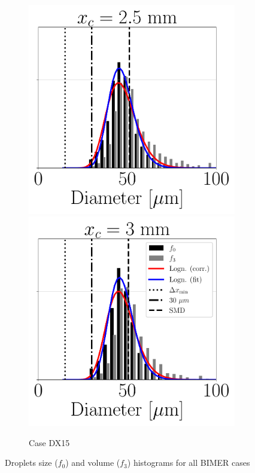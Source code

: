 \begin{figure}[ht]
\begin{subfigure}[b]{1.1\textwidth}
   \hspace*{-0.15in}
   \includegraphics[scale=0.28]{./part3_applications/figures_ch8_resolved/SPRAY_characterization/histograms_size_volume/DX15_xD08p33_histograms}
   \hspace*{-0.15in}
   \includegraphics[scale=0.28]{./part3_applications/figures_ch8_resolved/SPRAY_characterization/histograms_size_volume/DX15_xD10p00_histograms}
	\caption{Case DX15}
\end{subfigure}

   \caption{Droplets size ($f_0$) and volume ($f_3$) histograms for all BIMER cases}
\label{fig:ch8_jicf_size_volume_histograms_all}
\end{figure}

